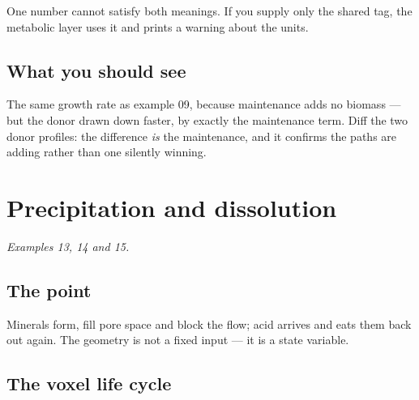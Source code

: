 One number cannot satisfy both meanings. If you supply only the shared tag, the
metabolic layer uses it and prints a warning about the units.

\section{What you should see}

The same growth rate as example 09, because maintenance adds no biomass --- but
the donor drawn down faster, by exactly the maintenance term. Diff the two
donor profiles: the difference \emph{is} the maintenance, and it confirms the
paths are adding rather than one silently winning.

\chapter{Precipitation and dissolution}
\label{ch:precip}

\emph{Examples 13, 14 and 15.}

\section{The point}

Minerals form, fill pore space and block the flow; acid arrives and eats them
back out again. The geometry is not a fixed input --- it is a state variable.

\section{The voxel life cycle}

\begin{center}
\end{center}

